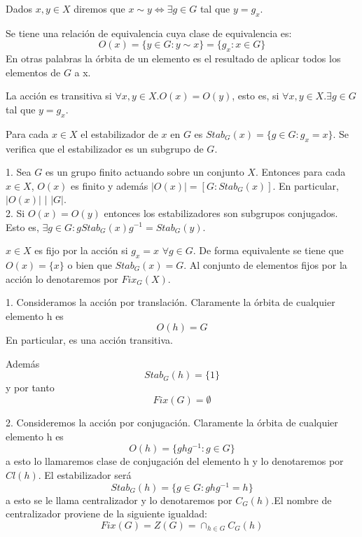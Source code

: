 \begin{ndef}
Dados $x,y \in X$ diremos que $x \sim y \iff \exists g \in G$ tal que $y = g_x$. 

Se tiene una relación de equivalencia cuya clase de equivalencia es: $$O(x) = \{y \in G:y \sim x\} = \{g_x:x \in G\}$$ En otras palabras la órbita de un elemento es el resultado de aplicar todos los elementos de $G$ a x. 

La acción es transitiva si $\forall x,y \in X.O(x) = O(y)$, esto es, si $\forall x,y \in X. \exists g \in G$ tal que $y = g_x$.
\end{ndef}

\begin{ndef}[Estabilizador]
Para cada $x \in X$ el estabilizador de $x$ en $G$ es $Stab_G(x) = \{g \in G:g_x = x\}$. Se verifica que el estabilizador es un subgrupo de $G$.
\end{ndef}

\begin{nprop}
1. Sea $G$ es un grupo finito actuando sobre un conjunto $X$. Entonces para cada $x \in X$, $O(x)$ es finito y además $|O(x)| = [G:Stab_G(x)]$. En particular, $|O(x)|$ $|$ $|G|$.\\
2. Si $O(x) = O(y)$ entonces los estabilizadores son subgrupos conjugados. Esto es, $\exists g \in G:g Stab_G(x) g^{-1} = Stab_G(y)$.
\end{nprop}

\begin{ndef}
$x \in X$ es fijo por la acción si $g_x = x$ $\forall g \in G$. De forma equivalente se tiene que $O(x) = \{x\}$ o bien que $Stab_G(x) = G$. Al conjunto de elementos fijos por la acción lo denotaremos por $Fix_G(X)$.
\end{ndef}

\begin{ejemplo}
1. Consideramos la acción por translación. Claramente la órbita de cualquier elemento h es $$O(h) = G$$ En particular, es una acción transitiva. 

Además $$Stab_G(h) = \{1\}$$ y por tanto $$Fix(G) = \emptyset$$

2. Consideremos la acción por conjugación. Claramente la órbita de cualquier elemento h es $$O(h) = \{ghg^{-1}:g \in G\}$$ a esto lo llamaremos clase de conjugación del elemento h y lo denotaremos por $Cl(h)$. El estabilizador será $$Stab_G(h) = \{g \in G:ghg^{-1}  = h\}$$ a esto se le llama centralizador y lo denotaremos por $C_G(h)$.El nombre de centralizador proviene de la siguiente igualdad: $$Fix(G) = Z(G) = \cap_{h \in G} C_G(h)$$ 
 \end{ejemplo}

